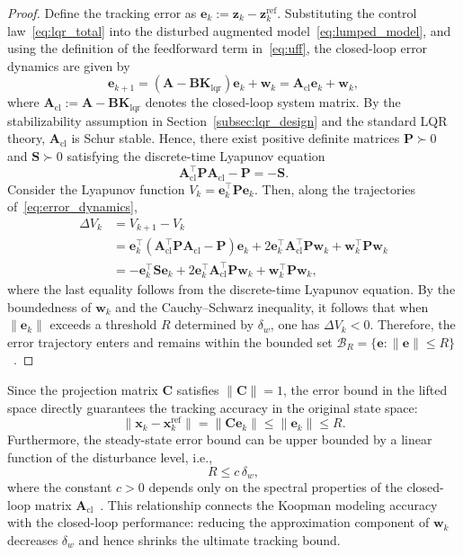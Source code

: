 \documentclass[letterpaper,10pt,conference]{ieeeconf}
\newcommand{\x}{\mathbf{x}}
\newcommand{\z}{\mathbf{z}}
\newcommand{\w}{\mathbf{w}}
\newcommand{\e}{\mathbf{e}}
\newcommand{\Kmat}{\mathbf{K}}
\newcommand{\A}{\mathbf{A}}
\newcommand{\B}{\mathbf{B}}
\newcommand{\C}{\mathbf{C}}
\begin{document}
\begin{proof}
Define the tracking error as $\e_k := \z_k - \z_k^{\text{ref}}$. Substituting the control law~\eqref{eq:lqr_total} into the disturbed augmented model~\eqref{eq:lumped_model}, and using the definition of the feedforward term in~\eqref{eq:uff}, the closed-loop error dynamics are given by
\begin{equation}
\label{eq:error_dynamics}
\e_{k+1} = (\A - \B\Kmat_{\text{lqr}})\e_k + \w_k = \A_{\text{cl}}\e_k + \w_k,
\end{equation}
where $\A_{\text{cl}} := \A - \B\Kmat_{\text{lqr}}$ denotes the closed-loop system matrix. By the stabilizability assumption in Section~\ref{subsec:lqr_design} and the standard LQR theory, $\A_{\text{cl}}$ is Schur stable. Hence, there exist positive definite matrices $\mathbf{P} \succ 0$ and $\mathbf{S} \succ 0$ satisfying the discrete-time Lyapunov equation
\[
\A_{\text{cl}}^\top \mathbf{P} \A_{\text{cl}} - \mathbf{P} = -\mathbf{S}.
\]
Consider the Lyapunov function $V_k = \e_k^\top \mathbf{P} \e_k$. Then, along the trajectories of~\eqref{eq:error_dynamics},
\begin{align}
\Delta V_k &= V_{k+1} - V_k \nonumber \\
&= \e_k^\top (\A_{\text{cl}}^\top \mathbf{P} \A_{\text{cl}} - \mathbf{P}) \e_k
+ 2\e_k^\top \A_{\text{cl}}^\top \mathbf{P}\w_k
+ \w_k^\top \mathbf{P}\w_k \nonumber \\
&= -\e_k^\top \mathbf{S} \e_k
+ 2\e_k^\top \A_{\text{cl}}^\top \mathbf{P}\w_k
+ \w_k^\top \mathbf{P}\w_k,
\end{align}
where the last equality follows from the discrete-time Lyapunov equation. By the boundedness of $\w_k$ and the Cauchy--Schwarz inequality, it follows that when $\|\e_k\|$ exceeds a threshold $R$ determined by $\delta_w$, one has $\Delta V_k < 0$. Therefore, the error trajectory enters and remains within the bounded set $\mathcal{B}_R = \{\e : \|\e\| \le R\}$~\cite{Blanchini2008,Khalil2002}.
\end{proof}

Since the projection matrix $\C$ satisfies $\|\C\| = 1$, the error bound in the lifted space directly guarantees the tracking accuracy in the original state space:
\[
\|\x_k - \x_k^{\text{ref}}\| = \|\C\e_k\| \le \|\e_k\| \le R.
\]
Furthermore, the steady-state error bound can be upper bounded by a linear function of the disturbance level, i.e.,
\[
R \le c\,\delta_w,
\]
where the constant $c > 0$ depends only on the spectral properties of the closed-loop matrix $\A_{\text{cl}}$~\cite{Blanchini2008}. This relationship connects the Koopman modeling accuracy with the closed-loop performance: reducing the approximation component of $\w_k$ decreases $\delta_w$ and hence shrinks the ultimate tracking bound.
\end{document}
